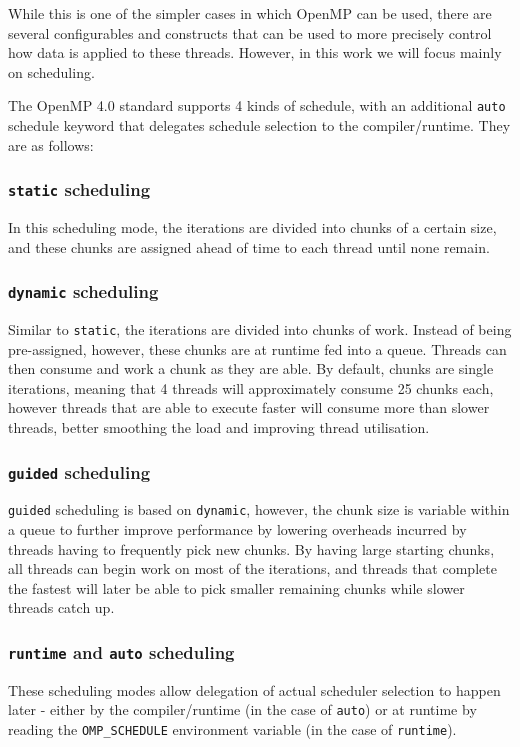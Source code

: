 \documentclass[a4paper]{article}
\begin{document}
        While this is one of the simpler cases in which OpenMP can be used, there are several configurables and
        constructs that can be used to more precisely control how data is applied to these threads. However, in this
        work we will focus mainly on scheduling.

        The OpenMP 4.0 standard \cite{OpenMP40Std} supports 4 kinds of schedule, with an additional \texttt{auto}
        schedule keyword that delegates schedule selection to the compiler/runtime. They are as follows:

            \subsubsection{\texttt{static} scheduling}
            In this scheduling mode, the iterations are divided into chunks of a certain size, and these chunks are
            assigned ahead of time to each thread until none remain.

            \subsubsection{\texttt{dynamic} scheduling}
            Similar to \texttt{static}, the iterations are divided into chunks of work. Instead of being pre-assigned,
            however, these chunks are at runtime fed into a queue. Threads can then consume and work a chunk as they
            are able. By default, chunks are single iterations, meaning that 4 threads will approximately consume 25
            chunks each, however threads that are able to execute faster will consume more than slower threads,
            better smoothing the load and improving thread utilisation.

            \subsubsection{\texttt{guided} scheduling}
            \texttt{guided} scheduling is based on \texttt{dynamic}, however, the chunk size is variable within a queue
            to further improve performance by lowering overheads incurred by threads having to frequently pick new
            chunks. By having large starting chunks, all threads can begin work on most of the iterations, and threads
            that complete the fastest will later be able to pick smaller remaining chunks while slower threads catch
            up.

            \subsubsection{\texttt{runtime} and \texttt{auto} scheduling}
            These scheduling modes allow delegation of actual scheduler selection to happen later - either by the
            compiler/runtime (in the case of \texttt{auto}) or at runtime by reading the \texttt{OMP\_SCHEDULE} 
            environment variable (in the case of \texttt{runtime}).
\end{document}
